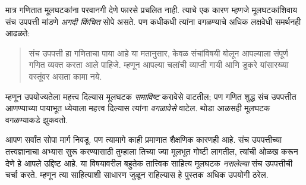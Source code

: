 \documentclass[../../../include/open-logic-section]{subfiles}
\begin{document}
मात्र गणितात मूलघटकांना परवानगी देणे फारसे प्रचलित नाही. त्याचे एक कारण म्हणजे मूलघटकांशिवाय संच उपपत्ती मांडणे \emph{अगदी किंचित} सोपे असते. पण कधीकधी त्यांना वगळण्याचे अधिक लक्षवेधी समर्थनही आढळते:
\begin{quote}
  संच उपपत्ती हा गणिताचा पाया आहे या मतानुसार, केवळ संचांविषयी बोलून आपल्याला संपूर्ण गणित व्यक्त करता आले पाहिजे. म्हणून आपल्या चलांची व्याप्ती गायी आणि डुकरे यांसारख्या वस्तूंवर असता कामा नये.
  \citep[p.~8]{Kunen1980}
\end{quote}
म्हणून उपयोज्यतेला महत्त्व दिल्यास मूलघटक \emph{समाविष्ट} करावेसे वाटतील; पण गणित शुद्ध संच उपपत्तीत आणण्याच्या पायाभूत ध्येयाला महत्त्व दिल्यास त्यांना \emph{वगळावेसे} वाटेल. थोडा आळसही मूलघटक वगळण्याकडे झुकवतो.

आपण सर्वांत सोपा मार्ग निवडू. पण त्यामागे काही प्रमाणात शैक्षणिक कारणही आहे. संच उपपत्तीच्या तत्त्वज्ञानाचा अभ्यास सुरू करण्यासाठी तुम्हाला तिच्या ज्या मूलभूत गोष्टी लागतील, त्यांची ओळख करून देणे हे आपले उद्दिष्ट आहे. या विषयावरील बहुतेक तात्त्विक साहित्य मूलघटक \emph{नसलेल्या} संच उपपत्तीची चर्चा करते. म्हणून त्या साहित्याशी साधारण जुळून राहिल्यास हे पुस्तक अधिक उपयोगी ठरेल.
\end{document}
